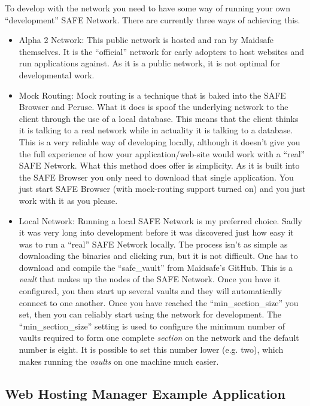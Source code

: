 To develop with the network you need to have some way of running your own ``development'' SAFE Network. There are currently three ways of achieving this.
\begin{itemize}
	\item Alpha 2 Network: This public network is hosted and ran by Maidsafe themselves. It is the ``official'' network for early adopters to host websites and run applications against. As it is a public network, it is not optimal for developmental work.
	\item Mock Routing: Mock routing is a technique that is baked into the SAFE Browser and Peruse. What it does is spoof the underlying network to the client through the use of a local database. This means that the client thinks it is talking to a real network while in actuality it is talking to a database. This is a very reliable way of developing locally, although it doesn't give you the full experience of how your application/web-site would work with a ``real'' SAFE Network. What this method does offer is simplicity. As it is built into the SAFE Browser you only need to download that single application. You just start SAFE Browser (with mock-routing support turned on) and you just work with it as you please.
	\item Local Network: Running a local SAFE Network is my preferred choice. Sadly it was very long into development before it was discovered just how easy it was to run a ``real'' SAFE Network locally. The process isn't as simple as downloading the binaries and clicking run, but it is not difficult. One has to download and compile the ``safe\_vault'' from Maidsafe's GitHub. This is a \textit{vault} that makes up the nodes of the SAFE Network. Once you have it configured, you then start up several vaults and they will automatically connect to one another. Once you have reached the ``min\_section\_size'' you set, then you can reliably start using the network for development. The ``min\_section\_size'' setting is used to configure the minimum number of vaults required to form one complete \textit{section} on the network and the default number is eight. It is possible to set this number lower (e.g. two), which makes running the \textit{vaults} on one machine much easier.
\end{itemize}

\subsection{Web Hosting Manager Example Application}


